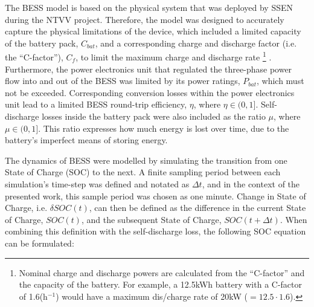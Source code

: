 \nomenclature{$\mu$}{Self-discharge losses of battery, where $\mu \in (0, 1]$}
\nomenclature{$\eta$}{Round-trip efficiency of power electronics, where $\eta \in (0, 1]$}

The BESS model is based on the physical system that was deployed by SSEN during the NTVV project.
Therefore, the model was designed to accurately capture the physical limitations of the device, which included a limited capacity of the battery pack, $C_{bat}$, and a corresponding charge and discharge factor (i.e. the ``C-factor''), $C_{f}$, to limit the maximum charge and discharge rate
\footnote{Nominal charge and discharge powers are calculated from the ``C-factor'' and the capacity of the battery. For example, a 12.5kWh battery with a C-factor of 1.6(h$^{-1}$) would have a maximum dis/charge rate of 20kW ($=12.5 \cdot 1.6$).}
.
Furthermore, the power electronics unit that regulated the three-phase power flow into and out of the BESS was limited by its power ratings, $P_{bat}$, which must not be exceeded.
Corresponding conversion losses within the power electronics unit lead to a limited BESS round-trip efficiency, $\eta$, where $\eta \in (0, 1]$.
Self-discharge losses inside the battery pack were also included as the ratio $\mu$, where $\mu \in (0, 1]$.
This ratio expresses how much energy is lost over time, due to the battery's imperfect means of storing energy.

The dynamics of BESS were modelled by simulating the transition from one State of Charge (SOC) to the next.
A finite sampling period between each simulation's time-step was defined and notated as $\Delta t$, and in the context of the presented work, this sample period was chosen as one minute.
Change in State of Charge, i.e. $\delta SOC(t)$, can then be defined as the difference in the current State of Charge, $SOC(t)$, and the subsequent State of Charge, $SOC(t+\Delta t)$.
When combining this definition with the self-discharge loss, the following SOC equation can be formulated:

